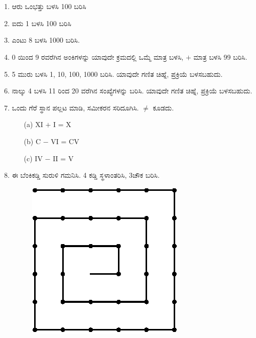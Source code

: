 \chapter{}\label{chap12}

\begin{enumerate}
\renewcommand{\labelenumi}{\bf\theenumi.}
\itemsep=5pt

\item ಆರು ಒಂಭತ್ತು ಬಳಸಿ 100 ಬರಿಸಿ 

\item ಐದು 1 ಬಳಸಿ 100 ಬರಿಸಿ

\item ಎಂಟು 8 ಬಳಸಿ 1000 ಬರಿಸಿ. 

\item 0 ಯಿಂದ 9 ರವರೆಗಿನ ಅಂಕಿಗಳನ್ನು ಯಾವುದೇ ಕ್ರಮದಲ್ಲಿ ಒಮ್ಮೆ ಮಾತ್ರ ಬಳಸಿ, $+$ ಮಾತ್ರ ಬಳಸಿ 99 ಬರಿಸಿ. 

\item 5 ಮುರು ಬಳಸಿ 1, 10, 100, 1000 ಬರಿಸಿ. ಯಾವುದೇ ಗಣಿತ ಚಿಹ್ನೆ, ಪ್ರಕ್ರಿಯೆ ಬಳಸಬಹುದು. 

\item ನಾಲ್ಕು 4 ಬಳಸಿ 11 ರಿಂದ 20 ವರೆಗಿನ ಸಂಖ್ಯೆಗಳನ್ನು ಬರಿಸಿ. ಯಾವುದೇ ಗಣಿತ ಚಿಹ್ನೆ, ಪ್ರಕ್ರಿಯೆ ಬಳಸಬಹುದು. 

\item ಒಂದು ಗೆರೆ ಸ್ಥಾನ ಪಲ್ಲಟ ಮಾಡಿ, ಸಮೀಕರನ ಸರಿದೂಗಿಸಿ. $\neq$ ಕೂಡದು. 
\begin{itemize}
\item[(a)] XI $+$ I = X
\item[(b)] C $-$ VI = CV
\item[(c)] IV $-$ II = V
\end{itemize}

\item ಈ ಬೆಂಕಿಕಡ್ಡಿ ಸುರುಳಿ ಗಮನಿಸಿ. 4 ಕಡ್ಡಿ ಸ್ಥಳಾಂತರಿಸಿ, 3ಚೌಕ ಬರಿಸಿ. 
\begin{figure}[H]
\centering
\includegraphics{images/chap12/q8.eps}
\end{figure}


\end{enumerate}
